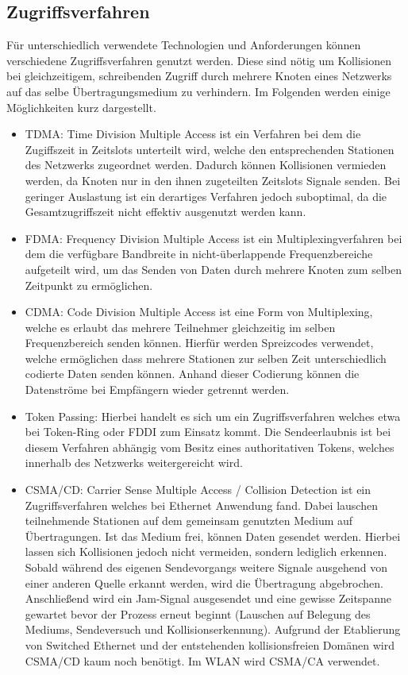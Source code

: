     \subsection{Zugriffsverfahren}
    Für unterschiedlich verwendete Technologien und Anforderungen können verschiedene Zugriffsverfahren genutzt werden. Diese sind nötig um Kollisionen bei gleichzeitigem,
    schreibenden Zugriff durch mehrere Knoten eines Netzwerks auf das selbe Übertragungsmedium zu verhindern. Im Folgenden werden einige Möglichkeiten kurz dargestellt.
        \begin{itemize}
            \item TDMA: Time Division Multiple Access ist ein Verfahren bei dem die Zugiffszeit in Zeitslots unterteilt wird, welche den entsprechenden
            Stationen des Netzwerks zugeordnet werden. Dadurch können Kollisionen vermieden werden, da Knoten nur in den ihnen zugeteilten Zeitslots Signale 
            senden. Bei geringer Auslastung ist ein derartiges Verfahren jedoch suboptimal, da die Gesamtzugriffszeit nicht effektiv ausgenutzt werden kann.
            \item FDMA: Frequency Division Multiple Access ist ein Multiplexingverfahren bei dem die verfügbare Bandbreite in nicht-überlappende Frequenzbereiche aufgeteilt wird,
            um das Senden von Daten durch mehrere Knoten zum selben Zeitpunkt zu ermöglichen.
            \item CDMA: Code Division Multiple Access ist eine Form von Multiplexing, welche es erlaubt das mehrere Teilnehmer gleichzeitig im selben Frequenzbereich
            senden können. Hierfür werden Spreizcodes verwendet, welche ermöglichen dass mehrere Stationen zur selben Zeit unterschiedlich codierte Daten senden können.
            Anhand dieser Codierung können die Datenströme bei Empfängern wieder getrennt werden.
            \item Token Passing: Hierbei handelt es sich um ein Zugriffsverfahren welches etwa bei Token-Ring oder FDDI zum Einsatz kommt. Die Sendeerlaubnis ist bei diesem
            Verfahren abhängig vom Besitz eines authoritativen Tokens, welches innerhalb des Netzwerks weitergereicht wird.
            \item CSMA/CD: Carrier Sense Multiple Access / Collision Detection ist ein Zugriffsverfahren welches bei Ethernet Anwendung fand. Dabei lauschen teilnehmende Stationen
            auf dem gemeinsam genutzten Medium auf Übertragungen. Ist das Medium frei, können Daten gesendet werden. Hierbei lassen sich Kollisionen jedoch nicht vermeiden, sondern lediglich 
            erkennen. Sobald während des eigenen Sendevorgangs weitere Signale ausgehend von einer anderen Quelle erkannt werden, wird die Übertragung abgebrochen. Anschließend wird ein
            Jam-Signal ausgesendet und eine gewisse Zeitspanne gewartet bevor der Prozess erneut beginnt (Lauschen auf Belegung des Mediums, Sendeversuch und Kollisionserkennung).
            Aufgrund der Etablierung von Switched Ethernet und der entstehenden kollisionsfreien Domänen wird CSMA/CD kaum noch benötigt. Im WLAN wird CSMA/CA verwendet.
        \end{itemize}
